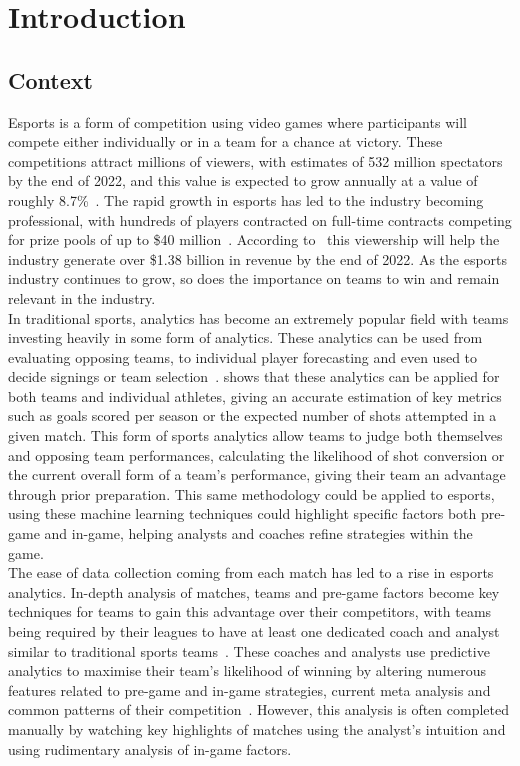 \chapter{Introduction}\label{ch:introduction}
\section{Context}\label{sec:Context}
Esports is a form of competition using video games where participants will compete either individually or in a team for a chance at victory.
These competitions attract millions of viewers, with estimates of 532 million spectators by the end of 2022, and this value is expected to grow annually at a value of roughly 8.7\%~\citep{newzoo2022viewers}.
The rapid growth in esports has led to the industry becoming professional, with hundreds of players contracted on full-time contracts competing for prize pools of up to \$40 million~\citep{esportsearnings}.
According to~\citet{newzoo2022viewers} this viewership will help the industry generate over \$1.38 billion in revenue by the end of 2022.
As the esports industry continues to grow, so does the importance on teams to win and remain relevant in the industry.\\

In traditional sports, analytics has become an extremely popular field with teams investing heavily in some form of analytics.
These analytics can be used from evaluating opposing teams, to individual player forecasting and even used to decide signings or team selection~\citep{sarlis2020sports, apostolou2019sports}.
\citet{apostolou2019sports, sarlis2020sports} shows that these analytics can be applied for both teams and individual athletes, giving an accurate estimation of key metrics such as goals scored per season or the expected number of shots attempted in a given match.
This form of sports analytics allow teams to judge both themselves and opposing team performances, calculating the likelihood of shot conversion or the current overall form of a team's performance, giving their team an advantage through prior preparation.
This same methodology could be applied to esports, using these machine learning techniques could highlight specific factors both pre-game and in-game, helping analysts and coaches refine strategies within the game.\\

The ease of data collection coming from each match has led to a rise in esports analytics.
In-depth analysis of matches, teams and pre-game factors become key techniques for teams to gain this advantage over their competitors, with teams being required by their leagues to have at least one dedicated coach and analyst similar to traditional sports teams~\citep{LCSRules}.
These coaches and analysts use predictive analytics to maximise their team's likelihood of winning by altering numerous features related to pre-game and in-game strategies, current \gls{meta} analysis and common patterns of their competition~\citep{kokkinakis2021metagaming}.
However, this analysis is often completed manually by watching key highlights of matches using the analyst's intuition and using rudimentary analysis of in-game factors.\\

